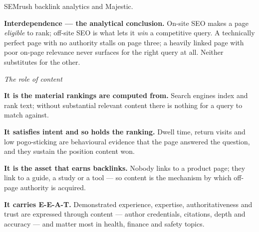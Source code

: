 \begin{qlist}
\begin{apts}
      SEMrush backlink analytics and Majestic.
\item \textbf{Interdependence --- the analytical conclusion.} On-site SEO makes
      a page \emph{eligible} to rank; off-site SEO is what lets it \emph{win} a
      competitive query. A technically perfect page with no authority stalls on
      page three; a heavily linked page with poor on-page relevance never
      surfaces for the right query at all. Neither substitutes for the other.
\end{apts}

\textit{The role of content}
\begin{apts}
\item \textbf{It is the material rankings are computed from.} Search engines
      index and rank text; without substantial relevant content there is
      nothing for a query to match against.
\item \textbf{It satisfies intent and so holds the ranking.} Dwell time, return
      visits and low pogo-sticking are behavioural evidence that the page
      answered the question, and they sustain the position content won.
\item \textbf{It is the asset that earns backlinks.} Nobody links to a product
      page; they link to a guide, a study or a tool --- so content is the
      mechanism by which off-page authority is acquired.
\item \textbf{It carries E-E-A-T.} Demonstrated experience, expertise,
      authoritativeness and trust are expressed through content --- author
      credentials, citations, depth and accuracy --- and matter most in health,
      finance and safety topics.
\end{apts}


\end{qlist}
